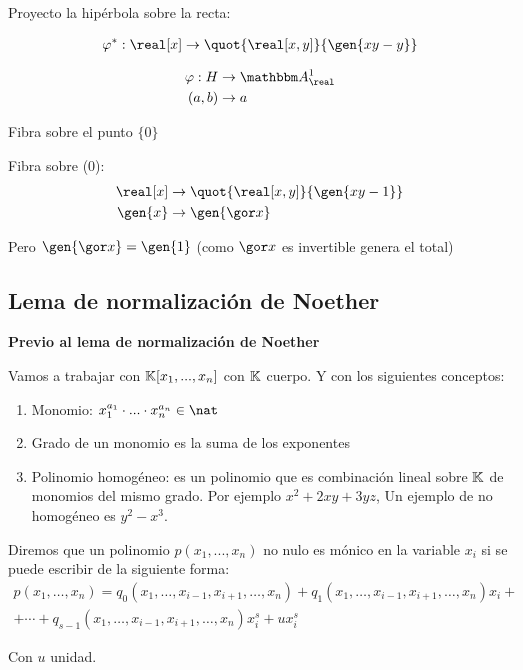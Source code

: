 \begin{example}
	Proyecto la hipérbola sobre la recta:

	\begin{align*}
		\varphi^*: \real[x]& \rightarrow \quot{\real[x,y]}{\gen{xy-y}} \\
	\end{align*}

		\begin{align*}
			\varphi: H & \rightarrow \A^1_{\real} \\
			(a,b) & \rightarrow a
		\end{align*}

		Fibra sobre el punto $\{0\}$

		Fibra sobre (0):
		\begin{align*}
			\real[x]& \rightarrow \quot{\real[x,y]}{\gen{xy-1}} \\
			\gen{x} & \rightarrow \gen{\cls{x}}
		\end{align*}

		Pero $\gen{\cls{x}} = \gen{1}$ (como $\cls{x}$ es invertible genera el total)
\end{example}

\subsection{Lema de normalización de Noether}

\textbf{Previo al lema de normalización de Noether}

Vamos a trabajar con $\mathbb{K}[x_1,...,x_n]$ con $\mathbb{K}$ cuerpo. Y con los siguientes conceptos:
\begin{enumerate}
	\item Monomio: $x_1^{a_1}\cdot...\cdot x_n^{a_n} \in \nat$
	\item Grado de un monomio es la suma de los exponentes
	\item Polinomio homogéneo: es un polinomio que es combinación lineal sobre $\mathbb{K}$ de monomios del mismo grado.
	Por ejemplo $x^2+2xy+3yz$, Un ejemplo de no homogéneo es $y^2-x^3$.
\end{enumerate}

\begin{defn}
	Diremos que un polinomio $p(x_1,...,x_n)$ no nulo es mónico en la variable $x_i$ si se puede escribir de la siguiente forma:
	\begin{multline*}
		p(x_1,\dotsc,x_n) = q_0(x_1,\dotsc,x_{i-1},x_{i+1},\dotsc,x_n)+q_1(x_1,\dotsc,x_{i-1},x_{i+1},\dotsc,x_n)x_i + \\ +\dotsb +q_{s-1}(x_1,\dotsc,x_{i-1},x_{i+1},\dotsc,x_n)x_i^s+ux_i^s
	\end{multline*}

	Con $u$ unidad.
\end{defn}

